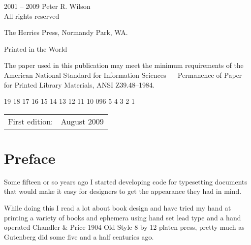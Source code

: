 \documentclass[10pt,letterpaper,extrafontsizes]{memoir}
\begin{document}
\begingroup
\footnotesize
\setlength{\parindent}{0pt}
\setlength{\parskip}{\baselineskip}
\textcopyright{} 2001 -- 2009 Peter R. Wilson \\
All rights reserved

The Herries Press, Normandy Park, WA.

Printed in the World 

The paper used in this publication may meet the minimum requirements
of the American National Standard for Information 
Sciences --- Permanence of Paper for Printed Library Materials, 
ANSI Z39.48--1984.

\begin{center}
19 18 17 16 15 14 13 12 11 10 09\hspace{2em}6 5 4 3 2 1
\end{center}
\begin{center}
\begin{tabular}{ll}
First edition:                        & August 2009 \\
\end{tabular}
\end{center}

\endgroup

\clearpage
\mbox{}

\cleardoublepage

\pagestyle{headings}

\setupshorttoc
\tableofcontents
\cleardoublepage
\setupparasubsecs
\setupmaintoc
\tableofcontents
\setlength{\unitlength}{1pt}
\clearpage 
\listoffigures
\clearpage
\listoftables
\clearpage

\chapter{Preface}

    Some fifteen or so years ago I started developing code for typesetting
documents that would make it easy for designers to get the appearance
they had in mind.


   While doing this I read a lot about book design and have tried my hand
at printing a variety of books and ephemera using hand set lead type 
and a hand operated Chandler \& Price 1904 Old Style 8 by 12 platen
press, pretty much as Gutenberg did some five and a half centuries ago.
\end{document}
